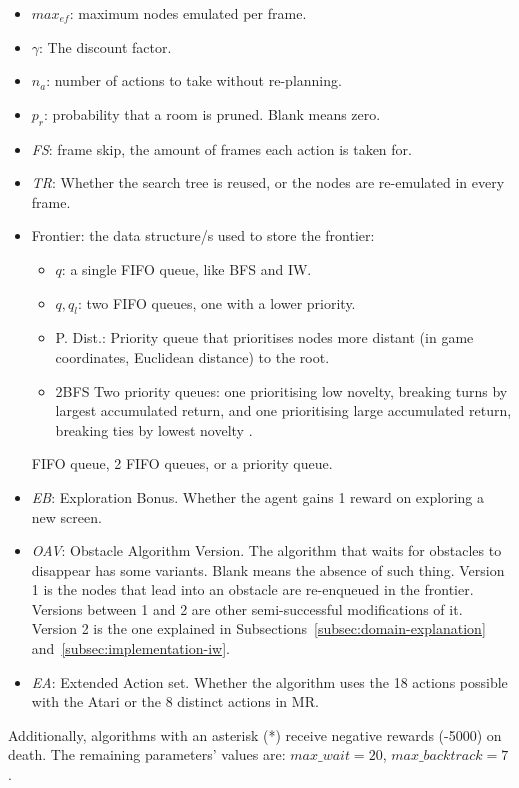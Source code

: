 \begin{itemize}
  \item $max_{ef}$: maximum nodes emulated per frame.
  \item $\gamma$: The discount factor.
  \item $n_a$: number of actions to take without re-planning.
  \item $p_r$: probability that a room is pruned. Blank means zero.
  \item \textit{FS}: frame skip, the amount of frames each action is taken for.
  \item \textit{TR}: Whether the search tree is reused, or the nodes are
    re-emulated in every frame.
  \item Frontier: the data structure/s used to store the frontier:
    \begin{itemize}
      \item $q$: a single \ac{FIFO} queue, like \ac{BFS} and \ac{IW}.
      \item $q,q_l$: two \ac{FIFO} queues, one with a lower priority.
      \item P. Dist.: Priority queue that prioritises nodes more distant (in
        game coordinates, Euclidean distance) to the root.
      \item 2BFS Two priority queues: one prioritising low novelty, breaking
        turns by largest accumulated return, and one prioritising large
accumulated return, breaking ties by lowest novelty \citep{lipovetzky2015classical}.
    \end{itemize}
    \ac{FIFO} queue, 2 \ac{FIFO} queues, or a priority queue.
  \item \textit{EB}: Exploration Bonus. Whether the agent gains 1 reward on
    exploring a new screen.
  \item \textit{OAV}: Obstacle Algorithm Version. The algorithm that waits for
    obstacles to disappear has some variants. Blank means the absence of such
    thing. Version 1 is the nodes that lead into an obstacle are re-enqueued in
    the frontier. Versions between 1 and 2 are other semi-successful
    modifications of it. Version 2 is the one explained in
Subsections~\ref{subsec:domain-explanation} and~\ref{subsec:implementation-iw}.
  \item \textit{EA}: Extended Action set. Whether the algorithm uses the 18
actions possible with the Atari or the 8 distinct actions in \ac{MR}.
\end{itemize}

Additionally, algorithms with an asterisk (*) receive negative rewards (-5000)
on death. The remaining parameters' values are: $max\_wait=20$, $max\_backtrack=7$.


